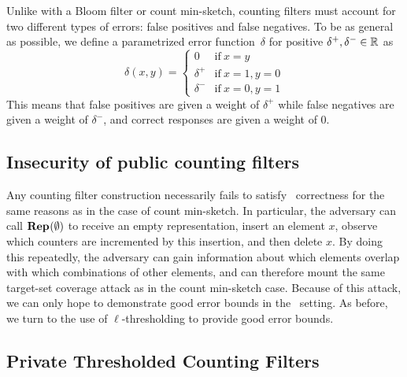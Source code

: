%
Unlike with a Bloom filter or count min-sketch, counting filters must account
for two different types of errors: false positives and false negatives. To be as
general as possible, we define a parametrized error function~$\delta$ for
positive $\delta^+, \delta^- \in \mathbb{R}$ as
\begin{equation}
  \delta(x, y) =
  \begin{cases}
    0 & \text{if}\ x = y \\
    \delta^+ & \text{if}\ x = 1, y = 0 \\
    \delta^- & \text{if}\ x = 0, y = 1
  \end{cases}
\end{equation}
This means that false positives are given a weight of $\delta^+$ while false
negatives are given a weight of $\delta^-$, and correct responses are given a
weight of 0.

\subsection{Insecurity of public counting filters}
Any counting filter construction necessarily fails to satisfy \errep\
correctness for the same reasons as in the case of count min-sketch. In
particular, the adversary can call $\textup{\textbf{Rep}}\hspace{0.5pt}(\emptyset)$ to receive an empty
representation, insert an element $x$, observe which counters are incremented by
this insertion, and then delete $x$. By doing this repeatedly, the adversary can
gain information about which elements overlap with which combinations of other
elements, and can therefore mount the same target-set coverage attack as in the
count min-sketch case. Because of this attack, we can only hope to demonstrate
good error bounds in the \erreps\ setting. As before, we turn to the use of
$\ell$-thresholding to provide good error bounds.

\subsection{Private Thresholded Counting Filters}

